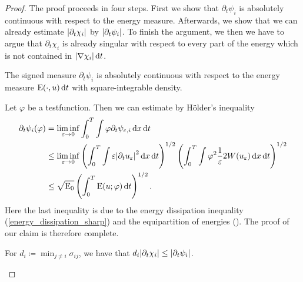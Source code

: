 \begin{proof}
	The proof proceeds in four steps. First we show that $ \partial_{ t } 
	\psi_{ i } $ is absolutely continuous with respect to the energy measure. 
	Afterwards, we show that we can already estimate $ \abs{ \partial_{ t } 
	\chi_{ i } } $ by $ \abs{ \partial_{ t } \psi_{ i } } $. To finish the 
	argument, we then we have to argue that $ \partial_{ t } \chi_{ i } $ is 
	already singular with respect to every part of the energy which is not 
	contained in $ \abs{ \nabla \chi_{ i } } \dd{ t } $.
	
	\begin{description}[wide=0pt]
		\item[Step 1:] The signed measure $ \partial_{  t } \psi_{ i } $ is 
		absolutely continuous with respect to the energy measure $ \operatorname{E} ( 
		\cdot, u ) \dd{t } $ with square-integrable density.
		
		Let $ \varphi $ be a testfunction. Then we can estimate by 
		Hölder's inequality
		\begin{align*}
			\partial_{ t } \psi_{ i } ( \varphi )
			& =
			\liminf_{ \varepsilon \to 0 }
			\int_{ 0 }^{ T }
			\int
			\varphi
			\partial_{ t } \psi_{ \varepsilon ,i }
			\dd{ x }
			\dd{ t }
			\\
			& \leq
			\liminf_{ \varepsilon \to 0 }
			\left(
			\int_{ 0 }^{ T }
			\int
			\varepsilon 
			\abs{ \partial_{ t } u_{ \varepsilon } }^{ 2 }
			\dd{ x }
			\dd{ t }
			\right)^{ 1/2 }
			\left(
			\int_{ 0 }^{ T }
			\int
			\varphi^{ 2 }
			\frac{ 1 }{ \varepsilon }
			2 W ( u_{ \varepsilon } )
			\dd{ x }
			\dd{ t }
			\right)^{ 1/2 }
			\\
			& \leq
			\sqrt{ \operatorname{E}_{ 0 } }
			\left(
			\int_{ 0 }^{ T }
			\operatorname{E} ( u ; \varphi )
			\dd{ t }
			\right)^{ 1/2 }.
		\end{align*}
		Here the last inequality is due to the energy dissipation inequality
		(\ref{energy_dissipation_sharp}) and the equipartition of energies 
		().
		The proof of our claim is therefore complete.
		
		\item[Step 2:] For $ d_{ i } \coloneqq \min_{ j \neq i } \sigma_{ i j } 
		$, we have 
		that $ d_{ i } \abs{ \partial_{ t } \chi_{ i } } \leq \abs{ \partial_{ 
		t } \psi_{ i } } $.
		

\end{description}
\end{proof}
